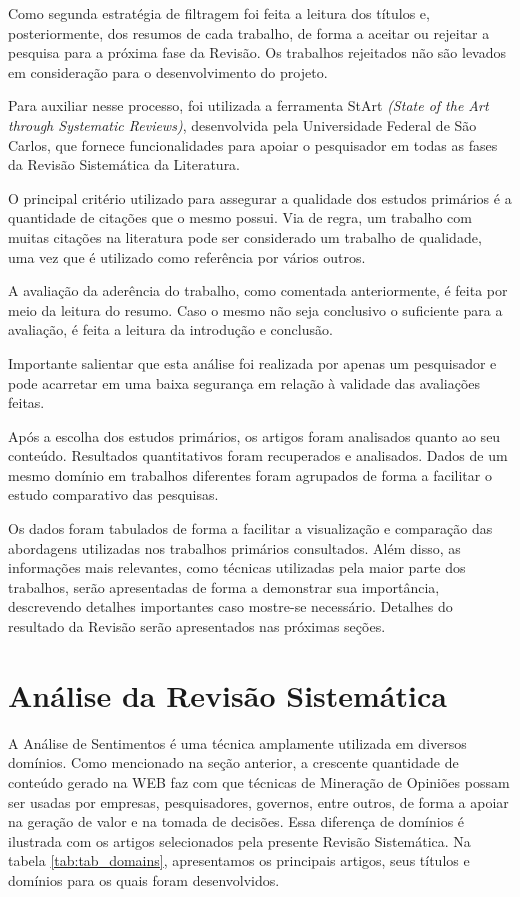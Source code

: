 \documentclass[12pt]{article}
\begin{document}
Como segunda estratégia de filtragem foi feita a leitura dos títulos e, posteriormente, dos resumos de cada trabalho, de forma a aceitar ou rejeitar a pesquisa para a próxima fase da Revisão. Os trabalhos rejeitados não são levados em consideração para o desenvolvimento do projeto.

Para auxiliar nesse processo, foi utilizada a ferramenta StArt  \emph{(State of the Art through Systematic Reviews)}, desenvolvida pela Universidade Federal de São Carlos, que fornece funcionalidades para apoiar o pesquisador em todas as fases da Revisão Sistemática da Literatura.

O principal critério utilizado para assegurar a qualidade dos estudos primários é a quantidade de citações que o mesmo possui. Via de regra, um trabalho com muitas citações na literatura pode ser considerado um trabalho de qualidade, uma vez que é utilizado como referência por vários outros. 

A avaliação da aderência do trabalho, como comentada anteriormente, é feita por meio da leitura do resumo. Caso o mesmo não seja conclusivo o suficiente para a avaliação, é feita a leitura da introdução e conclusão.

Importante salientar que esta análise foi realizada por apenas um pesquisador e pode acarretar em uma baixa segurança em relação à validade das avaliações feitas.

Após a escolha dos estudos primários, os artigos foram analisados quanto ao seu conteúdo. Resultados quantitativos foram recuperados e analisados. Dados de um mesmo domínio em trabalhos diferentes foram agrupados de forma a facilitar o estudo comparativo das pesquisas. 

Os dados foram  tabulados de forma a facilitar a visualização e comparação das abordagens utilizadas nos trabalhos primários consultados. Além disso, as informações mais relevantes, como técnicas utilizadas pela maior parte dos trabalhos, serão apresentadas de forma a demonstrar sua importância, descrevendo detalhes importantes caso mostre-se necessário. Detalhes do resultado da Revisão serão apresentados nas próximas seções.

\section{Análise da Revisão Sistemática}
A Análise de Sentimentos é uma técnica amplamente utilizada em diversos domínios. Como mencionado na seção anterior, a crescente quantidade de conteúdo gerado na WEB faz com que técnicas de Mineração de Opiniões possam ser usadas por empresas, pesquisadores, governos, entre outros, de forma a apoiar na geração de valor e na tomada de decisões. Essa diferença de domínios é ilustrada com os artigos selecionados pela presente Revisão Sistemática. Na tabela \ref{tab:tab_domains}, apresentamos os principais artigos, seus títulos e domínios para os quais foram desenvolvidos. 
\end{document}
